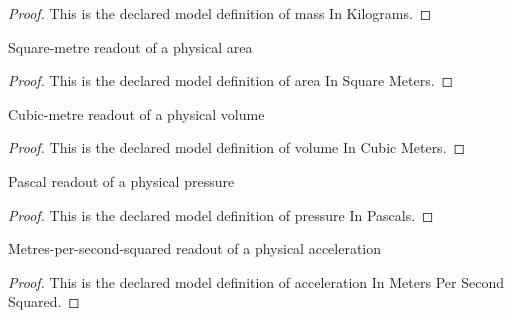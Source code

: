 \begin{proof}
  This is the declared model definition of mass In Kilograms.
\end{proof}
\begin{definition}
  \label{def:physics:phyx-mini-0360:phyxminiproblems-problemphyxmini0360-areainsquaremeters}
  Square-metre readout of a physical area
\end{definition}
\begin{proof}
  This is the declared model definition of area In Square Meters.
\end{proof}
\begin{definition}
  \label{def:physics:phyx-mini-0360:phyxminiproblems-problemphyxmini0360-volumeincubicmeters}
  Cubic-metre readout of a physical volume
\end{definition}
\begin{proof}
  This is the declared model definition of volume In Cubic Meters.
\end{proof}
\begin{definition}
  \label{def:physics:phyx-mini-0360:phyxminiproblems-problemphyxmini0360-pressureinpascals}
  Pascal readout of a physical pressure
\end{definition}
\begin{proof}
  This is the declared model definition of pressure In Pascals.
\end{proof}
\begin{definition}
  \label{def:physics:phyx-mini-0360:phyxminiproblems-problemphyxmini0360-accelerationinmeterspersecondsquared}
  Metres-per-second-squared readout of a physical acceleration
\end{definition}
\begin{proof}
  This is the declared model definition of acceleration In Meters Per Second Squared.
\end{proof}
